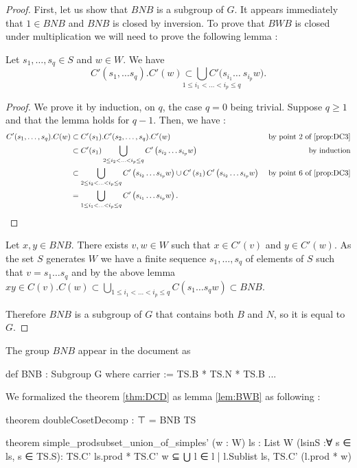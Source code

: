 \begin{proof}
    First, let us show that $BNB$ is a subgroup of $G$. It appears immediately that $1 \in BNB$ and $BNB $ is closed by inversion. To prove that $BWB$ is closed under multiplication we will need to prove the following lemma : 
\begin{lemme} \label{lem:BWB}
    Let $s_1, \ldots,s_q \in S$ and $w \in W$. We have
    \[
        C'\left( s_1,\ldots s_q \right). C'(w) \underset{1\le i_1 < ... < i_p \le q}{\subset \bigcup C' ( s_{i_1}\ldots }\ s_{i_p} w )
    .\] 
\end{lemme} 
\begin{proof}
    We prove it by induction, on $q$, the case $q=0$ being trivial. Suppose $q \ge 1 $ and that the lemma holds for $q -1$. Then, we have :
    \begin{align*}
        C'(s_1,\ldots,s_q). C(w) &\subset C'(s_1).C'(s_2,\ldots,s_q).C'(w) &\text{ by point 2 of \ref{prop:DC3}}\\
                                 &\subset C'(s_1) \bigcup_{2\le i_2 < ... < i_p \le q} C'\left( s_{i_2}\ldots s_{i_p} w \right)& \text{ by induction}\\
                                 & \subset \bigcup_{2\le i_2 < ... < i_p \le q} C'\left( s_{i_2}\ldots s_{i_p} w \right) \cup C'\left( s_1 \right)C'\left( s_{i_2}\ldots s_{i_p} w \right) & \text{ by point 6 of \ref{prop:DC3}}\\
                                 &= \bigcup_{1\le i_1 < ... < i_p \le q} C'\left( s_{i_1}\ldots s_{i_p} w \right)
    .\end{align*}
\end{proof}


Let $x,y \in BNB$. There exists $v,w \in W$ such that $x \in C'(v)$ and $y \in C'(w)$. As the set $S$ generates $W$ we have a finite sequence $s_1,\ldots,s_q$ of elements of $S$ such that $v = s_1 \ldots s_q$ and by the above lemma $xy \in C(v).C(w) \subset \bigcup_{1 \le i_1 < ... < i_p \le q} C(s_1\ldots s_q w) \subset BNB$.

Therefore $BNB$ is a subgroup of $G$ that contains both $B$ and $N$, so it is equal to $G$.
\end{proof}

The group $BNB$ appear in the document  as 
\begin{leancode}
def BNB : Subgroup G where
  carrier := TS.B *  TS.N * TS.B
  ...
\end{leancode}

We formalized the theorem \ref{thm:DCD} as lemma \ref{lem:BWB} as  following :
\begin{leancode}
theorem doubleCosetDecomp : ⊤ = BNB TS

theorem simple_prodsubset_union_of_simples' (w : W) {ls : List W} 
 (lsinS :∀ s ∈ ls, s ∈ TS.S): 
  TS.C' ls.prod * TS.C' w ⊆ ⋃ l ∈ { l | l.Sublist ls}, TS.C' (l.prod * w)
\end{leancode}

